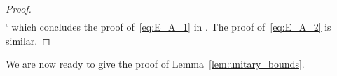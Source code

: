 \begin{proof}
\begin{align*}
\end{align*}`
which concludes the proof of~\eqref{eq:E_A_1} in . The proof of~\eqref{eq:E_A_2} is similar.
%
\end{proof}

We are now ready to give the proof of Lemma~\ref{lem:unitary_bounds}.

